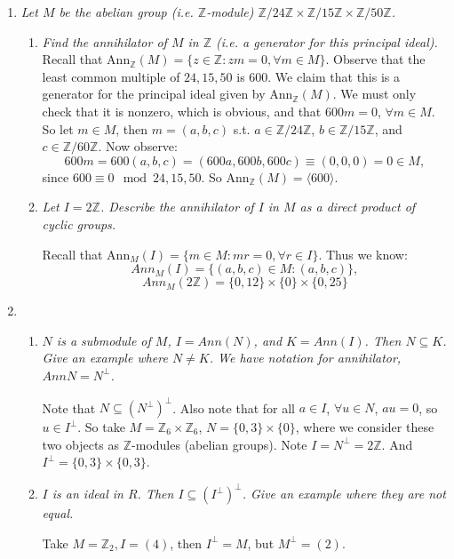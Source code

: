 \documentclass[9pt,reqno,twoside]{amsbook}
\theoremstyle{plain}
\numberwithin{section}{chapter}
\numberwithin{equation}{chapter}
\theoremstyle{definition}
\theoremstyle{remark}
\theoremstyle{plain}
\newcommand{\sub}{\subseteq}
\newcommand{\z}{\mathbb{Z}}
\begin{document}
\begin{enumerate}[label=\arabic*.]
\item \textit{Let $M$ be the abelian group (i.e. $\z$-module) $\z/24\z \times \z/15\z \times \z/50\z$. }
\begin{enumerate}
\item \textit{Find the annihilator of $M$ in $\z$ (i.e. a generator for this principal ideal). }\\
Recall that Ann$_{\z}(M) = \{z \in \z:zm = 0 ,\forall m \in M\}$. Observe that the least common multiple of $24,15,50$ is $600$. We claim that this is a generator for the principal ideal given by Ann$_\z(M)$. We must only check that it is nonzero, which is obvious, and that $600m = 0$, $\forall m \in M$. So let $m \in M$, then $m = (a,b,c)$ s.t. $a \in \z/24\z$, $b \in \z/15\z$, and $c \in \z/60\z$. Now observe:
$$
600m = 600(a,b,c) = (600a,600b,600c) \equiv (0,0,0) = 0 \in M,
$$
since $600 \equiv 0 \mod 24,15,50$. So Ann$_\z(M) = \langle 600 \rangle$. 
\item \textit{Let $I = 2\z$. Describe the annihilator of $I$ in $M$ as a direct product of cyclic groups. }


Recall that Ann$_M(I) = \{m \in M: mr = 0,\forall r \in I\}$. Thus we know: 
$$
Ann_M(I) = \{(a,b,c) \in M: (a,b,c)\},
$$
$$
Ann_M(2\z) = \{0,12\} \times \{0\} \times \{0,25\}
$$

\end{enumerate}

\item

\begin{enumerate}



\item \textit{$N$ is a submodule of $M$, $I = Ann(N)$, and $K = Ann(I)$. Then $N \sub K$. Give an example where $N \neq K$. We have notation for annihilator, $AnnN = N^{\perp}$. }

Note that $N \sub (N^\perp)^\perp$. Also note that for all $a \in I$, $\forall u \in N$, $au = 0$, so $u \in I^\perp$. So take $M = \z_6 \times \z_6$, $N = \{0,3\} \times \{0\}$, where we consider these two objects as $\z$-modules (abelian groups). Note $I = N^\perp = 2\z$. And $I^\perp = \{0,3\} \times \{0,3\}$. 

\item \textit{$I$ is an ideal in $R$. Then $I \sub (I^\perp)^\perp$. Give an example where they are not equal. }

Take $M = \z_2, I = (4)$, then $I^\perp = M$, but $M^\perp = (2)$. 




\end{enumerate}
\end{enumerate}
\end{document}
